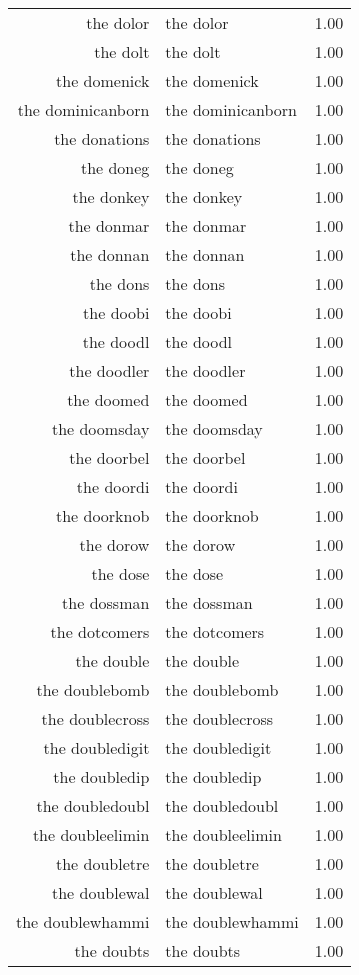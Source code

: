 \begin{table}[ht]
\begin{tabular}{rlr}
  the dolor & the dolor & 1.00 \\ 
  the dolt & the dolt & 1.00 \\ 
  the domenick & the domenick & 1.00 \\ 
  the dominicanborn & the dominicanborn & 1.00 \\ 
  the donations & the donations & 1.00 \\ 
  the doneg & the doneg & 1.00 \\ 
  the donkey & the donkey & 1.00 \\ 
  the donmar & the donmar & 1.00 \\ 
  the donnan & the donnan & 1.00 \\ 
  the dons & the dons & 1.00 \\ 
  the doobi & the doobi & 1.00 \\ 
  the doodl & the doodl & 1.00 \\ 
  the doodler & the doodler & 1.00 \\ 
  the doomed & the doomed & 1.00 \\ 
  the doomsday & the doomsday & 1.00 \\ 
  the doorbel & the doorbel & 1.00 \\ 
  the doordi & the doordi & 1.00 \\ 
  the doorknob & the doorknob & 1.00 \\ 
  the dorow & the dorow & 1.00 \\ 
  the dose & the dose & 1.00 \\ 
  the dossman & the dossman & 1.00 \\ 
  the dotcomers & the dotcomers & 1.00 \\ 
  the double & the double & 1.00 \\ 
  the doublebomb & the doublebomb & 1.00 \\ 
  the doublecross & the doublecross & 1.00 \\ 
  the doubledigit & the doubledigit & 1.00 \\ 
  the doubledip & the doubledip & 1.00 \\ 
  the doubledoubl & the doubledoubl & 1.00 \\ 
  the doubleelimin & the doubleelimin & 1.00 \\ 
  the doubletre & the doubletre & 1.00 \\ 
  the doublewal & the doublewal & 1.00 \\ 
  the doublewhammi & the doublewhammi & 1.00 \\ 
  the doubts & the doubts & 1.00 \\ 

\end{tabular}
\end{table}

